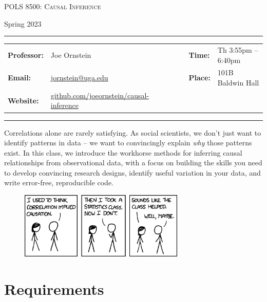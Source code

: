 \documentclass[11pt, letterpaper]{article}
\begin{document}
\begin{center}
{\Large \textsc{POLS 8500: Causal Inference}}
\end{center}
\begin{center}
{\large Spring 2023}
\end{center}

\begin{center}
\rule{6.5in}{0.4pt}
\begin{minipage}[t]{.96\textwidth}
\begin{tabular}{llcccll}
\textbf{Professor:} & Joe Ornstein & & &  & \textbf{Time:} & Th 3:55pm -- 6:40pm \\
\textbf{Email:} &  \href{mailto:jornstein@uga.edu}{jornstein@uga.edu} & & & & \textbf{Place:} & 101B Baldwin Hall\\
\textbf{Website:} & \href{https://github.com/joeornstein/causal-inference}{github.com/joeornstein/causal-inference} & & & & &
\end{tabular}
\end{minipage}
\rule{6.5in}{0.4pt}
\end{center}
\vspace{.15cm}
\setlength{\unitlength}{1in}
\renewcommand{\arraystretch}{2}

Correlations alone are rarely satisfying. As social scientists, we don't just want to identify patterns in data -- we want to convincingly explain \textit{why} those patterns exist. In this class, we introduce the workhorse methods for inferring causal relationships from observational data, with a focus on building the skills you need to develop convincing research designs, identify useful variation in your data, and write error-free, reproducible code.

\begin{figure}[h]
	\centering
	\href{https://xkcd.com/552/}{\includegraphics[width = 0.7\textwidth]{img/correlation.png}}
\end{figure}

\section*{Requirements}
\end{document}
